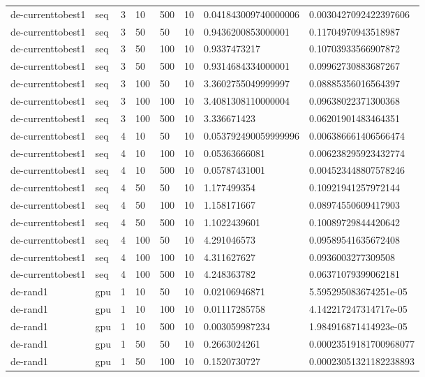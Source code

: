 \begin{table}[t]
\begin{tabular}{llllllll}
de-currenttobest1 & seq & 3 & 10 & 500 & 10 & 0.041843009740000006 & 0.0030427092422397606 \\
de-currenttobest1 & seq & 3 & 50 & 50 & 10 & 0.9436200853000001 & 0.11704970943518987 \\
de-currenttobest1 & seq & 3 & 50 & 100 & 10 & 0.9337473217 & 0.10703933566907872 \\
de-currenttobest1 & seq & 3 & 50 & 500 & 10 & 0.9314684334000001 & 0.09962730883687267 \\
de-currenttobest1 & seq & 3 & 100 & 50 & 10 & 3.3602755049999997 & 0.08885356016564397 \\
de-currenttobest1 & seq & 3 & 100 & 100 & 10 & 3.4081308110000004 & 0.09638022371300368 \\
de-currenttobest1 & seq & 3 & 100 & 500 & 10 & 3.336671423 & 0.06201901483464351 \\
de-currenttobest1 & seq & 4 & 10 & 50 & 10 & 0.053792490059999996 & 0.006386661406566474 \\
de-currenttobest1 & seq & 4 & 10 & 100 & 10 & 0.05363666081 & 0.006238295923432774 \\
de-currenttobest1 & seq & 4 & 10 & 500 & 10 & 0.05787431001 & 0.004523448807578246 \\
de-currenttobest1 & seq & 4 & 50 & 50 & 10 & 1.177499354 & 0.10921941257972144 \\
de-currenttobest1 & seq & 4 & 50 & 100 & 10 & 1.158171667 & 0.08974550609417903 \\
de-currenttobest1 & seq & 4 & 50 & 500 & 10 & 1.1022439601 & 0.10089729844420642 \\
de-currenttobest1 & seq & 4 & 100 & 50 & 10 & 4.291046573 & 0.09589541635672408 \\
de-currenttobest1 & seq & 4 & 100 & 100 & 10 & 4.311627627 & 0.0936003277309508 \\
de-currenttobest1 & seq & 4 & 100 & 500 & 10 & 4.248363782 & 0.06371079399062181 \\
de-rand1 & gpu & 1 & 10 & 50 & 10 & 0.02106946871 & 5.595295083674251e-05 \\
de-rand1 & gpu & 1 & 10 & 100 & 10 & 0.01117285758 & 4.142217247314717e-05 \\
de-rand1 & gpu & 1 & 10 & 500 & 10 & 0.003059987234 & 1.984916871414923e-05 \\
de-rand1 & gpu & 1 & 50 & 50 & 10 & 0.2663024261 & 0.00023519181700968077 \\
de-rand1 & gpu & 1 & 50 & 100 & 10 & 0.1520730727 & 0.00023051321182238893 \\

\end{tabular}
\end{table}
